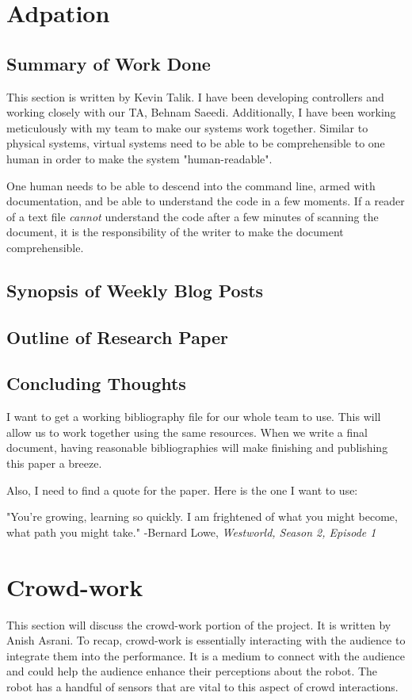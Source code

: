 \documentclass[onecolumn, draftclsnofoot,10pt, compsoc]{IEEEtran}
\begin{document}
\section{Adpation}
\subsection{Summary of Work Done}
 This section is written by Kevin Talik. I have been developing controllers and working closely with our TA, Behnam Saeedi. Additionally, I have been working meticulously with my team to make our systems work together. Similar to physical systems, virtual systems need to be able to be comprehensible to one human in order to make the system "human-readable".

 One human needs to be able to descend into the command line, armed with documentation, and be able to understand the code in a few moments. If a reader of a text file \textit{cannot} understand the code after a few minutes of scanning the document, it is the responsibility of the writer to make the document comprehensible.
 \subsection{Synopsis of Weekly Blog Posts}


\subsection{Outline of Research Paper}
\subsection{Concluding Thoughts}
 I want to get a working bibliography file for our whole team to use. This will allow us to work together using the same resources. When we write a final document, having reasonable bibliographies will make finishing and publishing this paper a breeze.


 Also, I need to find a quote for the paper. Here is the one I want to use:


 \begin{displayquote}
	 "You're growing, learning so quickly. I am frightened of what you might become, what path you might take."
	 -Bernard Lowe, \textit{Westworld, Season 2, Episode 1}
 \end{displayquote}

\section{Crowd-work}
This section will discuss the crowd-work portion of the project. It is written by Anish Asrani. To recap, crowd-work is essentially interacting with the audience to integrate them into the performance. It is a medium to connect with the audience and could help the audience enhance their perceptions about the robot. The robot has a handful of sensors that are vital to this aspect of crowd interactions.
\end{document}

